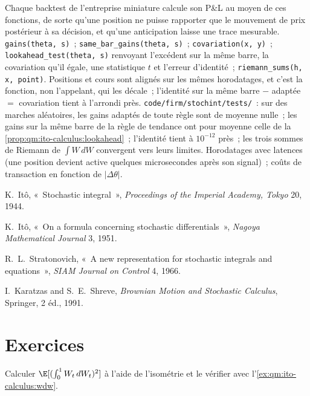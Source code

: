 \begin{build}
 Chaque backtest de l'entreprise miniature calcule son P\&L au moyen de ces fonctions,
de sorte qu'une position ne puisse rapporter que le mouvement de prix postérieur à sa décision, et qu'une
anticipation laisse une trace mesurable.
 \texttt{gains(theta, s)}~; \texttt{same\_bar\_gains(theta, s)}~;
\texttt{covariation(x, y)}~; \texttt{lookahead\_test(theta, s)} renvoyant l'excédent sur la même barre, la
covariation qu'il égale, une statistique $t$ et l'erreur d'identité~; \texttt{riemann\_sums(h, x,
point)}.
 Positions et cours sont alignés sur les mêmes horodatages, et c'est la fonction, non
l'appelant, qui les décale~; l'identité sur la même barre $-$ adaptée $=$ covariation tient à l'arrondi près.
 \texttt{code/firm/stochint/tests/}~: sur des marches aléatoires, les gains adaptés de
toute règle sont de moyenne nulle~; les gains sur la même barre de la règle de tendance ont pour moyenne celle de la
\cref{prop:qm:ito-calculus:lookahead}~; l'identité tient à $10^{-12}$ près~; les trois sommes de Riemann de
$\int W\,dW$ convergent vers leurs limites.
 Horodatages avec latences (une position devient active quelques microsecondes après son
signal)~; coûts de transaction en fonction de $|\Delta\theta|$.
\end{build}

\begin{omsources}
\item K.~Itô, «~Stochastic integral~», \emph{Proceedings of the Imperial Academy, Tokyo} 20, 1944.
\item K.~Itô, «~On a formula concerning stochastic differentials~», \emph{Nagoya Mathematical
Journal} 3, 1951.
\item R.~L.~Stratonovich, «~A new representation for stochastic integrals and equations~»,
\emph{SIAM Journal on Control} 4, 1966.
\item I.~Karatzas and S.~E.~Shreve, \emph{Brownian Motion and Stochastic Calculus}, Springer,
2 éd., 1991.
\end{omsources}

\section{Exercices}

\begin{exercise}[$\star$]\label{exo:qm:ito-calculus:1}
Calculer $\E[(\int_0^1W_t\,dW_t)^2]$ à l'aide de l'isométrie et le vérifier avec l'\cref{ex:qm:ito-calculus:wdw}.
\end{exercise}

